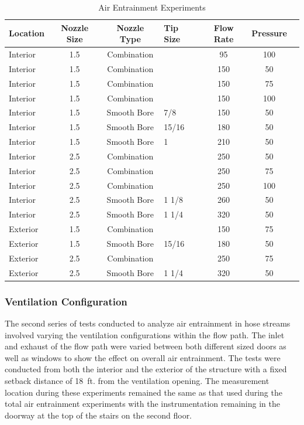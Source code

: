 \documentclass[12pt,oneside]{book}
\begin{document}
\begin{table}[!ht]
\centering
\caption{Air Entrainment Experiments}\label{Total_Air_Entrainment_Experiments}
\begin{tabular}{lcclccc}
\toprule[1.5pt]
Location & Nozzle Size & Nozzle Type & Tip Size & Flow Rate & Pressure \\ 
\midrule
Interior & 1.5 & Combination &  & 95 & 100 \\
Interior & 1.5 & Combination &  & 150 & 50 \\
Interior & 1.5 & Combination &  & 150 & 75 \\
Interior & 1.5 & Combination &  & 150 & 100 \\
Interior & 1.5 & Smooth Bore & 7/8 & 150 & 50 \\
Interior & 1.5 & Smooth Bore & 15/16 & 180 & 50 \\
Interior & 1.5 & Smooth Bore & 1 & 210 & 50 \\
Interior & 2.5 & Combination &  & 250 & 50 \\
Interior & 2.5 & Combination &  & 250 & 75 \\
Interior & 2.5 & Combination &  & 250 & 100 \\
Interior & 2.5 & Smooth Bore & 1 1/8 & 260 & 50 \\
Interior & 2.5 & Smooth Bore & 1 1/4 & 320 & 50 \\
Exterior & 1.5 & Combination &  & 150 & 75 \\
Exterior & 1.5 & Smooth Bore & 15/16 & 180 & 50 \\
Exterior & 2.5 & Combination &  & 250 & 75 \\
Exterior & 2.5 & Smooth Bore & 1 1/4 & 320 & 50 \\
\bottomrule[1.25pt]
\end{tabular}
\end{table}

\clearpage

\subsubsection{Ventilation Configuration}

The second series of tests conducted to analyze air entrainment in hose streams involved varying the ventilation configurations within the flow path. The inlet and exhaust of the flow path were varied between both different sized doors as well as windows to show the effect on overall air entrainment. The tests were conducted from both the interior and the exterior of the structure with a fixed setback distance of 18~ft. from the ventilation opening. The measurement location during these experiments remained the same as that used during the total air entrainment experiments with the instrumentation remaining in the doorway at the top of the stairs on the second floor.
\end{document}
